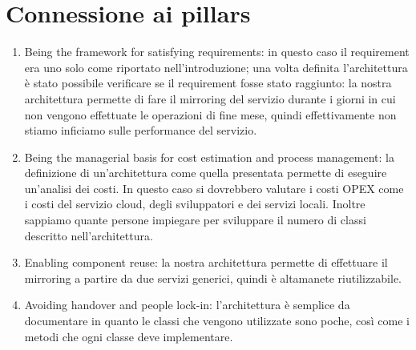 \documentclass[a4paper]{article}
\begin{document}
\section{Connessione ai pillars}

\begin{enumerate}
    \item Being the framework for satisfying requirements: in questo caso il requirement era uno solo
    come riportato nell'introduzione; una volta definita l'architettura è stato possibile verificare se
    il requirement fosse stato raggiunto: la nostra architettura permette di fare il mirroring del servizio durante
    i giorni in cui non vengono effettuate le operazioni di fine mese, quindi
    effettivamente non stiamo inficiamo sulle performance del servizio.
    \item Being the managerial basis for cost estimation and process
    management: la definizione di un'architettura come quella presentata
    permette di eseguire un'analisi dei costi. In questo caso si dovrebbero
    valutare i costi
    OPEX come i costi del servizio cloud, degli sviluppatori e dei servizi
    locali. Inoltre
    sappiamo quante persone impiegare per sviluppare il numero di classi descritto nell'architettura.
    \item Enabling component reuse: la nostra architettura permette di
    effettuare il mirroring a partire da due servizi generici,
    quindi è altamanete riutilizzabile.
    \item Avoiding handover and people lock-in: l'architettura è semplice da
    documentare in quanto le classi che vengono utilizzate sono poche,
    così come i metodi che ogni classe deve implementare.
\end{enumerate}
\end{document}
